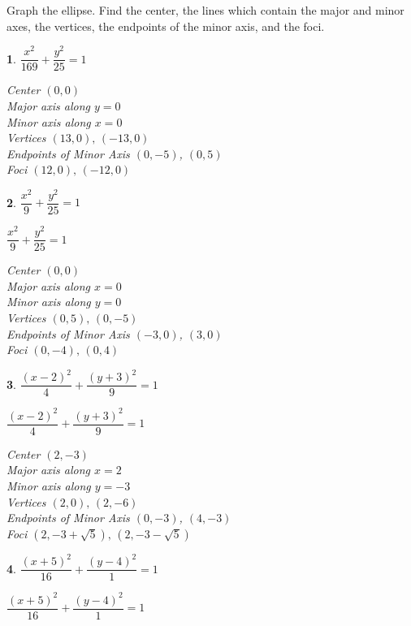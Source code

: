 \documentclass{amsbook}
\newtheorem{exc}{}
\newenvironment{ex}{\begin{exc}\normalfont}{\end{exc}}
\numberwithin{section}{chapter}
\numberwithin{equation}{chapter}
\begin{document}
Graph the ellipse.  Find the center, the lines which contain the major and minor axes, the vertices, the endpoints of the minor axis, and the foci.
\begin{multicols}{2}
	\begin{ex}
	$\dfrac{x^{2}}{169} + \dfrac{y^{2}}{25} = 1$
	\begin{sol}
	Center $(0, 0)$\\
	Major axis along $y = 0$\\
	Minor axis along $x = 0$\\
	Vertices $(13, 0), \, (-13, 0)$\\
	Endpoints of Minor Axis $(0,-5)$, $(0,5)$ \\
	Foci $(12, 0), \, (-12, 0)$\\
	\end{sol}
	\end{ex}

	\begin{ex}
		 $\dfrac{x^2}{9} + \dfrac{y^2}{25} = 1$
		\begin{sol}
			$\dfrac{x^{2}}{9} + \dfrac{y^{2}}{25} = 1$
			
			Center $(0, 0)$\\
			Major axis along $x = 0$\\
			Minor axis along $y = 0$\\
			Vertices $(0,5), \, (0,-5)$\\
			Endpoints of Minor Axis $(-3,0)$, $(3,0)$ \\
			Foci $(0,-4), \, (0,4)$\\
		\end{sol}
	\end{ex}

\begin{ex}
	$\dfrac{(x - 2)^{2}}{4} + \dfrac{(y + 3)^{2}}{9} = 1$
	\begin{sol}
	$\dfrac{(x - 2)^{2}}{4} + \dfrac{(y + 3)^{2}}{9} = 1$
	
	Center $(2, -3)$\\
	Major axis along $x = 2$\\
	Minor axis along $y = -3$\\
	Vertices $(2, 0), \, (2, -6)$\\
	Endpoints of Minor Axis $(0,-3)$, $(4,-3)$\\
	Foci $(2, -3 + \sqrt{5}), \, (2, -3 - \sqrt{5})$\\	
	\end{sol}
\end{ex}

\begin{ex}
	$\dfrac{(x + 5)^{2}}{16} + \dfrac{(y - 4)^{2}}{1} = 1$
	\begin{sol}
		$\dfrac{(x + 5)^{2}}{16} + \dfrac{(y - 4)^{2}}{1} = 1$
		

\end{sol}
\end{ex}
\end{multicols}
\end{document}
